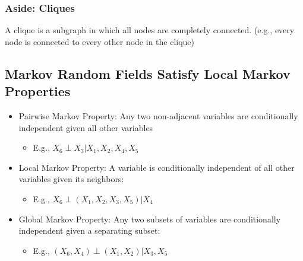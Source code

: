 \documentclass[10pt]{article}
\begin{document}
\subsubsection*{Aside: Cliques}
A clique is a subgraph in which all nodes are completely connected.  (e.g., every node is connected to every other node in the clique)

\subsection*{Markov Random Fields Satisfy Local Markov Properties}
\begin{center}
\end{center}
\begin{itemize}
	\item Pairwise Markov Property: Any two non-adjacent variables are conditionally independent given all other variables
	\begin{itemize}
	    \item E.g., $X_6 \perp X_3 | X_1, X_2, X_4, X_5$
    \end{itemize}
    \item Local Markov Property: A variable is conditionally independent of all other variables given its neighbors:
    \begin{itemize}
	    \item E.g., $X_6 \perp (X_1, X_2, X_3, X_5) | X_4$
    \end{itemize}
    \item Global Markov Property: Any two subsets of variables are conditionally independent given a separating subset:
    \begin{itemize}
	    \item E.g., $(X_6, X_4) \perp (X_1, X_2) | X_3, X_5$
    \end{itemize}
\end{itemize}
\end{document}
